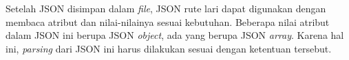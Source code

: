 Setelah JSON disimpan dalam \textit{file}, JSON rute lari dapat digunakan dengan membaca atribut dan nilai-nilainya sesuai kebutuhan. Beberapa nilai atribut dalam JSON ini  berupa JSON \textit{object}, ada yang berupa JSON \textit{array}. Karena hal ini,  \textit{parsing} dari JSON ini harus dilakukan sesuai dengan ketentuan tersebut. 


%
%
%
